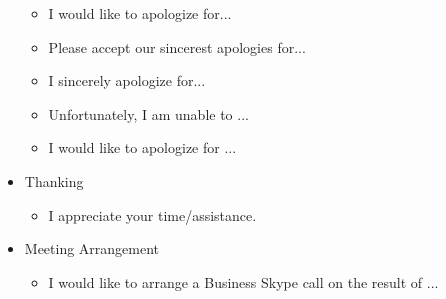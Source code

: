\begin{itemize}
	\begin{itemize}
	\item I would like to apologize for...
	\item Please accept our sincerest apologies for...
	\item I sincerely apologize for...
	\item Unfortunately, I am unable to ...
	\item I would like to apologize for ...
	\end{itemize}
\item Thanking
	\begin{itemize}
	\item I appreciate your time/assistance.
	\end{itemize}
\item Meeting Arrangement
	\begin{itemize}
	\item I would like to arrange a Business Skype call on the result of ...
	\end{itemize}
\end{itemize}

